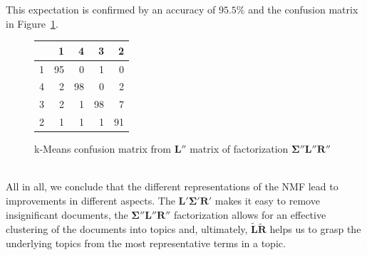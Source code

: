 \documentclass{support/acm_proc_article-sp}
\begin{document}
    This expectation is confirmed by an accuracy of $95.5\%$ and the confusion matrix in Figure~\ref{tab:k-means-slr}.
    \begin{figure}[htbp]
        \begin{center}
            \begin{tabular}{r | r r r r}
                & 1 & 4 & 3 & 2 \\
                \hline
                1 & 95 & 0 & 1 & 0 \\
                4 & 2 & 98 & 0 & 2 \\
                3 & 2 & 1 & 98 & 7 \\
                2 & 1 & 1 & 1 & 91
            \end{tabular}
        \end{center}
        \caption{k-Means confusion matrix from $\mathbf{{L''}}$ matrix of factorization $\mathbf{\Sigma''}\mathbf{L''}\mathbf{R''}$}
        \label{tab:k-means-slr}
    \end{figure} \\
    All in all, we conclude that the different representations of the NMF lead to improvements in different aspects.
    The $\mathbf{L'}\mathbf{\Sigma'}\mathbf{R'}$ makes it easy to remove insignificant documents, the
    $\mathbf{\Sigma''}\mathbf{L''}\mathbf{R''}$ factorization allows for an effective clustering of the documents into
    topics and, ultimately, $\mathbf{\tilde{L}\tilde{R}}$ helps us to grasp the underlying topics from the most
    representative terms in a topic.


    
    
\end{document}
